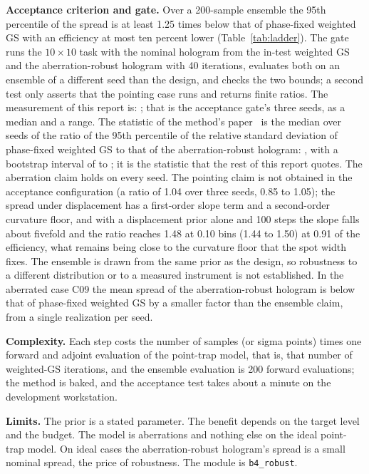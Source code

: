 \textbf{Acceptance criterion and gate.} Over a 200-sample ensemble the 95th percentile of the spread is at least 1.25 times below that of phase-fixed weighted GS with an efficiency at most ten percent lower (Table~\ref{tab:ladder}). The gate runs the $10\times10$ task with the nominal hologram from the in-test weighted GS and the aberration-robust hologram with 40 iterations, evaluates both on an ensemble of a different seed than the design, and checks the two bounds; a second test only asserts that the pointing case runs and returns finite ratios. The measurement of this report is: ; that is the acceptance gate's three seeds, as a median and a range. The statistic of the method's paper~\cite{aberpaper} is the median over  seeds of the ratio of the 95th percentile of the relative standard deviation of phase-fixed weighted GS to that of the aberration-robust hologram: , with a bootstrap interval of  to ; it is the statistic that the rest of this report quotes. The aberration claim holds on every seed. The pointing claim is not obtained in the acceptance configuration (a ratio of 1.04 over three seeds, 0.85 to 1.05); the spread under displacement has a first-order slope term and a second-order curvature floor, and with a displacement prior alone and 100 steps the slope falls about fivefold and the ratio reaches 1.48 at 0.10 bins (1.44 to 1.50) at 0.91 of the efficiency, what remains being close to the curvature floor that the spot width fixes. The ensemble is drawn from the same prior as the design, so robustness to a different distribution or to a measured instrument is not established. In the aberrated case C09 the mean spread of the aberration-robust hologram is below that of phase-fixed weighted GS by a smaller factor than the ensemble claim, from a single realization per seed.

\textbf{Complexity.} Each step costs the number of samples (or sigma points) times one forward and adjoint evaluation of the point-trap model, that is, that number of weighted-GS iterations, and the ensemble evaluation is 200 forward evaluations; the method is baked, and the acceptance test takes about a minute on the development workstation.

\textbf{Limits.} The prior is a stated parameter. The benefit depends on the target level and the budget. The model is aberrations and nothing else on the ideal point-trap model. On ideal cases the aberration-robust hologram's spread is a small nominal spread, the price of robustness. The module is \texttt{b4\_robust}.

